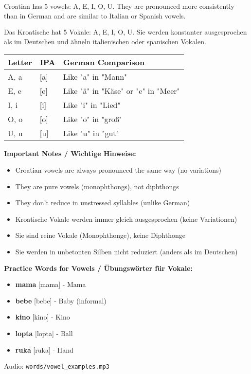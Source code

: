Croatian has 5 vowels: A, E, I, O, U. They are pronounced more consistently than in German and are similar to Italian or Spanish vowels.

Das Kroatische hat 5 Vokale: A, E, I, O, U. Sie werden konstanter ausgesprochen als im Deutschen und ähneln italienischen oder spanischen Vokalen.

\begin{tcolorbox}[colback=lightgreen!30, colframe=green!60!black, title=\textbf{Croatian Vowels / Kroatische Vokale}]

\begin{center}
\begin{tabular}{lll}
\toprule
\textbf{Letter} & \textbf{IPA} & \textbf{German Comparison} \\
\midrule
A, a & [a] & Like "a" in "Mann" \\
E, e & [e] & Like "ä" in "Käse" or "e" in "Meer" \\
I, i & [i] & Like "i" in "Lied" \\
O, o & [o] & Like "o" in "groß" \\
U, u & [u] & Like "u" in "gut" \\
\bottomrule
\end{tabular}
\end{center}

\textbf{Important Notes / Wichtige Hinweise:}
\begin{itemize}
    \item Croatian vowels are always pronounced the same way (no variations)
    \item They are pure vowels (monophthongs), not diphthongs
    \item They don't reduce in unstressed syllables (unlike German)
    \item Kroatische Vokale werden immer gleich ausgesprochen (keine Variationen)
    \item Sie sind reine Vokale (Monophthonge), keine Diphthonge
    \item Sie werden in unbetonten Silben nicht reduziert (anders als im Deutschen)
\end{itemize}

\textbf{Practice Words for Vowels / Übungswörter für Vokale:}
\begin{itemize}
    \item \textbf{mama} [mama] - Mama
    \item \textbf{bebe} [bebe] - Baby (informal)
    \item \textbf{kino} [kino] - Kino
    \item \textbf{lopta} [lopta] - Ball
    \item \textbf{ruka} [ruka] - Hand
\end{itemize}

Audio: \texttt{words/vowel\_examples.mp3}

\end{tcolorbox}

